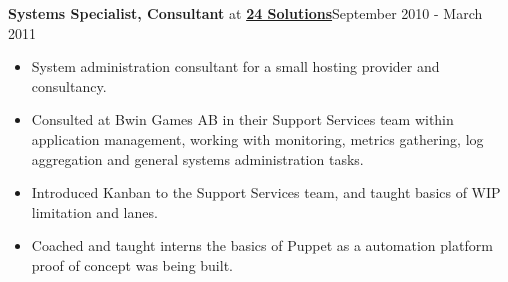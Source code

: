 \documentclass[8pt]{article}
\newenvironment{outerlist}[1][\enskip\textbullet]%
        {\begin{itemize}[#1]}{\end{itemize}%
         \vspace{-.6\baselineskip}}
\newcommand{\blankline}{\quad\pagebreak[2]}
\begin{document}
 \textbf{Systems Specialist, Consultant} at \href{http://www.24solutions.se}{\textbf{24 Solutions}}\hfill {September 2010 - March 2011}
\begin{outerlist}
\item[] System administration consultant for a small hosting provider and consultancy.

	\item Consulted at Bwin Games AB in their Support Services team within application management, working with monitoring, metrics gathering, log aggregation and general systems administration tasks.
	\item Introduced Kanban to the Support Services team, and taught basics of WIP limitation and lanes.
	\item Coached and taught interns the basics of Puppet as a automation platform proof of concept was being built.
\end{outerlist}
\blankline
\end{document}
